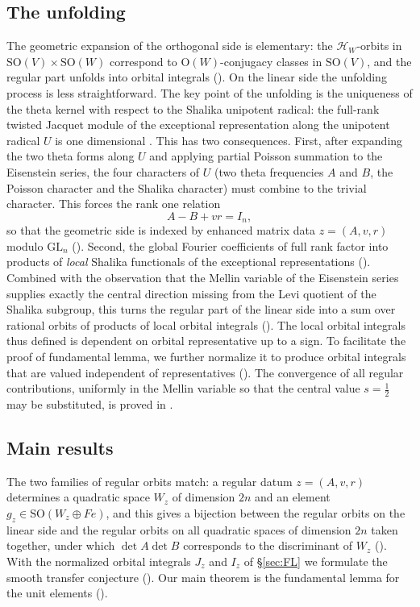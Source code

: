 \documentclass[11pt,oneside,notitlepage]{book}
\numberwithin{equation}{section}
\theoremstyle{plain}
\theoremstyle{definition}
\newcommand{\GL}{\mathrm{GL}}
\newcommand{\SO}{\mathrm{SO}}
\newcommand{\Ort}{\mathrm{O}}
\begin{document}
\subsection*{The unfolding}
The geometric expansion of the orthogonal side is elementary: the $\mathcal H_W$-orbits in $\SO(V)\times\SO(W)$ correspond to $\Ort(W)$-conjugacy classes in $\SO(V)$, and the regular part unfolds into orbital integrals (). On the linear side the unfolding process is less straightforward. The key point of the unfolding is the uniqueness of the theta kernel with respect to the Shalika unipotent radical: the full-rank twisted Jacquet module of the exceptional representation along the unipotent radical $U$ is one dimensional \cite[Theorem 3.1]{Kaplan}. This has two consequences. First, after expanding the two theta forms along $U$ and applying partial Poisson summation to the Eisenstein series, the four characters of $U$ (two theta frequencies $A$ and $B$, the Poisson character and the Shalika character) must combine to the trivial character. This forces the rank one relation
\[A-B+vr=I_n,\]
so that the geometric side is indexed by enhanced matrix data $z=(A,v,r)$ modulo $\GL_n$ (). Second, the global Fourier coefficients of full rank factor into products of \emph{local} Shalika functionals of the exceptional representations (). Combined with the observation that the Mellin variable of the Eisenstein series supplies exactly the central direction missing from the Levi quotient of the Shalika subgroup, this turns the regular part of the linear side into a sum over rational orbits of products of local orbital integrals (). The local orbital integrals thus defined is dependent on orbital representative up to a sign. To facilitate the proof of fundamental lemma, we further normalize it to produce orbital integrals that are valued independent of representatives (). The convergence of all regular contributions, uniformly in the Mellin variable so that the central value $s=\frac12$ may be substituted, is proved in .

\subsection*{Main results}
The two families of regular orbits match: a regular datum $z=(A,v,r)$ determines a quadratic space $W_z$ of dimension $2n$ and an element $g_z\in\SO(W_z\oplus Fe)$, and this gives a bijection between the regular orbits on the linear side and the regular orbits on all quadratic spaces of dimension $2n$ taken together, under which $\det A\det B$ corresponds to the discriminant of $W_z$ (). With the normalized orbital integrals $J_z$ and $I_z$ of \S\ref{sec:FL} we formulate the smooth transfer conjecture (). Our main theorem is the fundamental lemma for the unit elements ().
\end{document}
